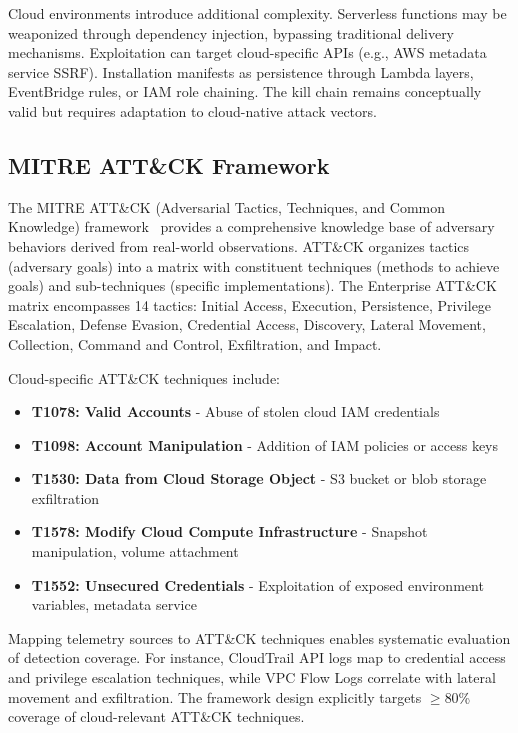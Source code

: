 Cloud environments introduce additional complexity. Serverless functions may be weaponized through dependency injection, bypassing traditional delivery mechanisms. Exploitation can target cloud-specific APIs (e.g., AWS metadata service SSRF). Installation manifests as persistence through Lambda layers, EventBridge rules, or IAM role chaining. The kill chain remains conceptually valid but requires adaptation to cloud-native attack vectors.

\subsection{MITRE ATT\&CK Framework}
The MITRE ATT\&CK (Adversarial Tactics, Techniques, and Common Knowledge) framework~\cite{mitreattack2023} provides a comprehensive knowledge base of adversary behaviors derived from real-world observations. ATT\&CK organizes tactics (adversary goals) into a matrix with constituent techniques (methods to achieve goals) and sub-techniques (specific implementations). The Enterprise ATT\&CK matrix encompasses 14 tactics: Initial Access, Execution, Persistence, Privilege Escalation, Defense Evasion, Credential Access, Discovery, Lateral Movement, Collection, Command and Control, Exfiltration, and Impact.

Cloud-specific ATT\&CK techniques include:
\begin{itemize}
    \item \textbf{T1078: Valid Accounts} - Abuse of stolen cloud IAM credentials
    \item \textbf{T1098: Account Manipulation} - Addition of IAM policies or access keys
    \item \textbf{T1530: Data from Cloud Storage Object} - S3 bucket or blob storage exfiltration
    \item \textbf{T1578: Modify Cloud Compute Infrastructure} - Snapshot manipulation, volume attachment
    \item \textbf{T1552: Unsecured Credentials} - Exploitation of exposed environment variables, metadata service
\end{itemize}

Mapping telemetry sources to ATT\&CK techniques enables systematic evaluation of detection coverage. For instance, CloudTrail API logs map to credential access and privilege escalation techniques, while VPC Flow Logs correlate with lateral movement and exfiltration. The framework design explicitly targets $\geq$80\% coverage of cloud-relevant ATT\&CK techniques.


